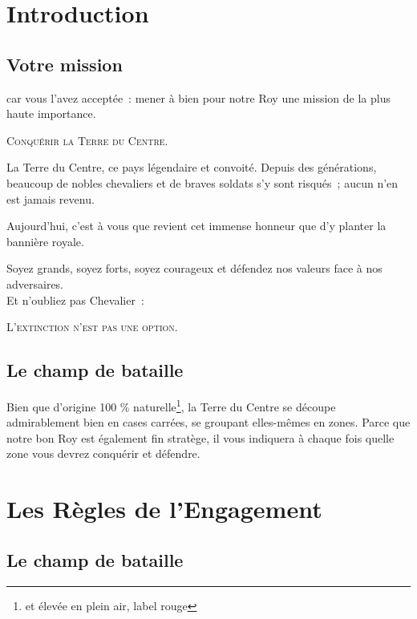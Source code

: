 \section{Introduction}

\newpage

\subsection{Votre mission}

car vous l'avez acceptée~: mener à bien
pour notre Roy une mission de la plus haute importance.

\begin{center}
  {\large\textsc{Conquérir la Terre du Centre.}}
\end{center}

La Terre du Centre, ce pays légendaire et convoité. Depuis des
générations, beaucoup de nobles chevaliers et de braves soldats s'y sont
risqués~; aucun n'en est jamais revenu.

Aujourd'hui, c'est à vous que revient cet immense honneur que d'y
planter la bannière royale.

Soyez grands, soyez forts, soyez courageux et défendez nos valeurs
face à nos adversaires.\\

Et n'oubliez pas Chevalier~:

\begin{center}
  \textsc{L'extinction n'est pas une option.}
\end{center}

\subsection{Le champ de bataille}

Bien que d'origine 100 \%{} naturelle\footnote{et élevée en plein air,
  label rouge}, la Terre du Centre se découpe admirablement bien en
cases carrées, se groupant elles-mêmes en zones. Parce que notre bon
Roy est également fin stratège, il vous indiquera à chaque fois quelle
zone vous devrez conquérir et défendre.
\newpage

\section{Les Règles de l'Engagement}

\subsection{Le champ de bataille}

